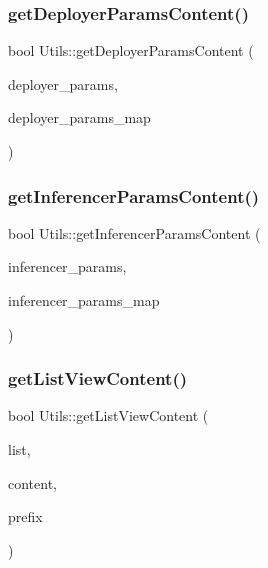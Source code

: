 \mbox{\label{class_utils_a67febf7d08f4b9e5e8a105317556c22b}} 
\subsubsection{\texorpdfstring{get\+Deployer\+Params\+Content()}{getDeployerParamsContent()}}
{\footnotesize\ttfamily bool Utils\+::get\+Deployer\+Params\+Content (\begin{DoxyParamCaption}\item[{const Q\+Group\+Box $\ast$}]{deployer\+\_\+params,  }\item[{std\+::map$<$ std\+::string, std\+::string $>$ \&}]{deployer\+\_\+params\+\_\+map }\end{DoxyParamCaption})\hspace{0.3cm}{\ttfamily [static]}}

\mbox{\label{class_utils_ae909b1275beb381a21977eb3618d31cd}} 
\subsubsection{\texorpdfstring{get\+Inferencer\+Params\+Content()}{getInferencerParamsContent()}}
{\footnotesize\ttfamily bool Utils\+::get\+Inferencer\+Params\+Content (\begin{DoxyParamCaption}\item[{const Q\+Group\+Box $\ast$}]{inferencer\+\_\+params,  }\item[{std\+::map$<$ std\+::string, std\+::string $>$ \&}]{inferencer\+\_\+params\+\_\+map }\end{DoxyParamCaption})\hspace{0.3cm}{\ttfamily [static]}}

\mbox{\label{class_utils_af7234a751d8a81bd01774e9af9e403be}} 
\subsubsection{\texorpdfstring{get\+List\+View\+Content()}{getListViewContent()}}
{\footnotesize\ttfamily bool Utils\+::get\+List\+View\+Content (\begin{DoxyParamCaption}\item[{const Q\+List\+View $\ast$}]{list,  }\item[{std\+::vector$<$ std\+::string $>$ \&}]{content,  }\item[{const std\+::string \&}]{prefix }\end{DoxyParamCaption})\hspace{0.3cm}{\ttfamily [static]}}



